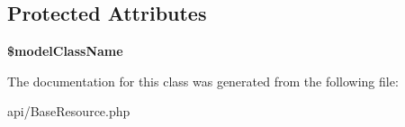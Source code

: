 \subsection*{Protected Attributes}
\begin{DoxyCompactItemize}
\item 
\hypertarget{classDMA_1_1Friends_1_1Api_1_1GenericModelRepository_a24215ef1696b0dedaf385b16f03ea000}{{\bfseries \$model\+Class\+Name}}\label{classDMA_1_1Friends_1_1Api_1_1GenericModelRepository_a24215ef1696b0dedaf385b16f03ea000}

\end{DoxyCompactItemize}


The documentation for this class was generated from the following file\+:\begin{DoxyCompactItemize}
\item 
api/Base\+Resource.\+php\end{DoxyCompactItemize}
